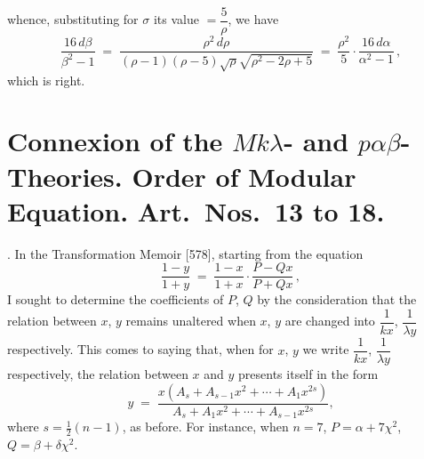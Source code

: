 \documentclass[11pt]{article}
\begin{document}
\newpage

\noindent whence, substituting for $\sigma$ its value $=\dfrac{5}{\rho}$, we have
\[
\frac{16\,d\beta}{\beta^2 - 1} \;=\; \frac{\rho^2\,d\rho}{(\rho - 1)(\rho - 5)\sqrt{\rho}\sqrt{\rho^2 - 2\rho + 5}} \;=\; \frac{\rho^2}{5}\cdot\frac{16\,d\alpha}{\alpha^2 - 1}\,,
\]
which is right.

\bigskip

\section*{Connexion of the $Mk\lambda$- and $p\alpha\beta$-Theories. Order of Modular Equation. Art.\ Nos.\ 13 to 18.}

. In the Transformation Memoir [578], starting from the equation
\[
\frac{1 - y}{1 + y} \;=\; \frac{1 - x}{1 + x}\cdot\frac{P - Qx}{P + Qx}\,,
\]
I sought to determine the coefficients of $P$, $Q$ by the consideration that the relation between $x$, $y$ remains unaltered when $x$, $y$ are changed into $\dfrac{1}{kx}$, $\dfrac{1}{\lambda y}$ respectively. This comes to saying that, when for $x$, $y$ we write $\dfrac{1}{kx}$, $\dfrac{1}{\lambda y}$ respectively, the relation between $x$ and $y$ presents itself in the form
\[
y \;=\; \frac{x(A_s + A_{s-1}x^2 + \cdots + A_1 x^{2s})}{A_s + A_1 x^2 + \cdots + A_{s-1}x^{2s}},
\]
where $s = \tfrac{1}{2}(n-1)$, as before. For instance, when $n=7$, $P = \alpha + 7\chi^2$, $Q = \beta + \delta\chi^2$.

\medskip
\end{document}
